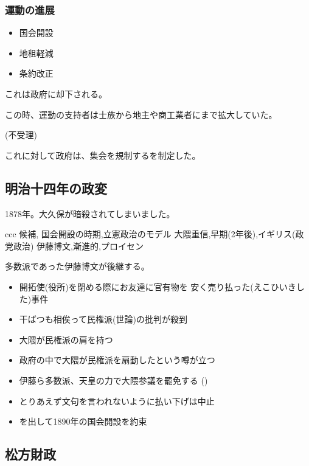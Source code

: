 \documentclass[12pt,fleqn]{ltjsarticle}
\begin{document}
\subsubsection{運動の進展}
\begin{itemize}
\item 国会開設
\item 地租軽減
\item 条約改正
\end{itemize}
これは政府に却下される。

この時、運動の支持者は士族から地主や商工業者にまで拡大していた。

(不受理)

これに対して政府は、集会を規制するを制定した。

\subsection{明治十四年の政変}
1878年。大久保が暗殺されてしまいました。

\begin{csvtab}{ccc}
候補, 国会開設の時期,立憲政治のモデル
大隈重信,早期(2年後),イギリス(政党政治)
伊藤博文,漸進的,プロイセン
\end{csvtab}
多数派であった伊藤博文が後継する。

\begin{itemize}
\item 開拓使(役所)を閉める際にお友達に官有物を
安く売り払った(えこひいきした)事件
\item 干ばつも相俟って民権派(世論)の批判が殺到
\item 大隈が民権派の肩を持つ
\item 政府の中で大隈が民権派を扇動したという噂が立つ
\item 伊藤ら多数派、天皇の力で大隈参議を罷免する
()
\item とりあえず文句を言われないように払い下げは中止
\item {}を出して1890年の国会開設を約束
\end{itemize}

\subsection{松方財政}
\end{document}
